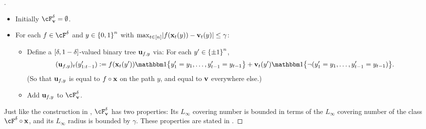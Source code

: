 \begin{proof}[]
\begin{itemize}[leftmargin=*]
\item Initially $\cF^{\delta}_{\vv} = \emptyset$.
\item For each $f\in\Fclip$ and $y\in\crl*{0,1}^{n}$ with $\max_{t\in\brk*{n}}\abs*{f(\x_{t}(y))-\vv_{t}(y)} \le \gamma$: 
\begin{itemize}
\item Define a $\brk*{\delta, 1-\delta}$-valued binary tree $\uu_{f,y}$ via: For each $y'\in\pmo^{n}$, 
\[
  (\uu_{f,y})_{t}(y'_{1:t-1}) \ldef f(\x_{t}(y'))\ind\crl*{y'_1=y_1,\ldots,y'_{t-1}=y_{t-1}} + \vv_{t}(y')\ind\crl*{\neg{}(y'_1=y_1,\ldots,y'_{t-1}=y_{t-1})}.
\]
(So that $\uu_{f,y}$ is equal to $f\circ\x$ on the path $y$, and equal to $\vv$ everywhere else.)
\item Add $\uu_{f,y}$ to $\cF_{\vv}^{\delta}$.
\end{itemize}
\end{itemize}

Just like the construction in , $\cF_{\vv}^{\delta}$ has two properties: Its $L_{\infty}$ covering number is bounded in terms of the $L_{\infty}$ covering number of the class $\Fclip\circ{}\x$, and its $L_{\infty}$ radius is bounded by $\gamma$. These properties are stated in .


\end{proof}
